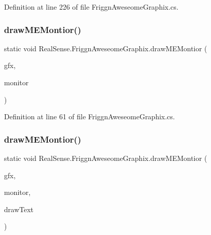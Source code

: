 Definition at line 226 of file Friggn\+Aweseome\+Graphix.\+cs.

\mbox{\label{class_real_sense_1_1_friggn_aweseome_graphix_a9c50e2b0d08aa7fc1f45ef717a6af85a}} 
\subsubsection{\texorpdfstring{draw\+M\+E\+Montior()}{drawMEMontior()}\hspace{0.1cm}{\footnotesize\ttfamily [1/2]}}
{\footnotesize\ttfamily static void Real\+Sense.\+Friggn\+Aweseome\+Graphix.\+draw\+M\+E\+Montior (\begin{DoxyParamCaption}\item[{Graphics}]{gfx,  }\item[{\hyperlink{class_real_sense_1_1_friggn_aweseome_graphix_1_1_m_e_monitor}{M\+E\+Monitor}}]{monitor }\end{DoxyParamCaption})\hspace{0.3cm}{\ttfamily [static]}}



Definition at line 61 of file Friggn\+Aweseome\+Graphix.\+cs.

\mbox{\label{class_real_sense_1_1_friggn_aweseome_graphix_a25acb9a9102fc1c49ec141ea947acbe8}} 
\subsubsection{\texorpdfstring{draw\+M\+E\+Montior()}{drawMEMontior()}\hspace{0.1cm}{\footnotesize\ttfamily [2/2]}}
{\footnotesize\ttfamily static void Real\+Sense.\+Friggn\+Aweseome\+Graphix.\+draw\+M\+E\+Montior (\begin{DoxyParamCaption}\item[{Graphics}]{gfx,  }\item[{\hyperlink{class_real_sense_1_1_friggn_aweseome_graphix_1_1_m_e_monitor}{M\+E\+Monitor}}]{monitor,  }\item[{bool}]{draw\+Text }\end{DoxyParamCaption})\hspace{0.3cm}{\ttfamily [static]}}



